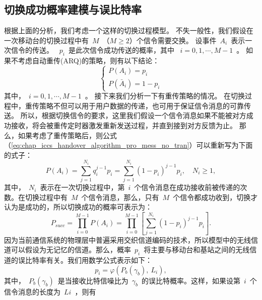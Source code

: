 \subsection{切换成功概率建模与误比特率}
根据上面的分析，我们考虑一个这样的切换过程模型。
不失一般性，我们假设在一次移动台的切换过程中有~$M$~（$M \ge 2 $）个信令需要交换。
设事件~$A_i$~表示一次信令的传送。
 ~$p_i$~是此次信令成功传送的概率，其中 ~$i = 0,1, \cdots, M-1 $~。
如果不考虑自动重传(ARQ)的策略，则有以下结论：
\begin{equation}
\label{eq:chap_iccs_handover_algorithm_pro_mess_no_tran}
\begin{cases}
P(A_{i})=p_{i}\\
P(\bar{A}_{i})=1- p_{i}
\end{cases}
\end{equation}
其中，~$i=0,1,\cdots,M-1$~。
接下来我们分析一下有重传策略的情况。
在切换过程中，重传策略不但可以用于用户数据的传递，也可用于保证信令消息的可靠传送。
所以，根据切换信令的要求，这里我们假设一个信令消息如果不能被对方成功接收，将会被重传定时器激发重新发送过程，并直到接到对方反馈为止。
那么，如果考虑了重传策略后，则公式 （\ref{eq:chap_iccs_handover_algorithm_pro_mess_no_tran}）可以重新写为下面的式子：
\begin{equation}
\label{eq:chap_iccs_handover_algorithm_Pro_basic01}
P(A_{i})=\sum_{j=1}^{N_{i}}q_{i}^{j-1}p_{i}=\sum_{j=1}^{N_{i}}
(1-p_{i})^{j-1}p_{i},\quad N_{i}\geq1,
\end{equation}
其中，~$N_i$~表示在一次切换过程中，第~$i$~个信令消息在成功接收前被传递的次数。在切换过程中有~$M$~个信令消息，那么，只有~$M$~个信令都成功收到，切换才认为是成功的，所以切换成功的概率可表示为：
\begin{equation}
\label{eq:chap_iccs_handover_algorithm_Pro_basic02}
P_{succ}=\prod_{i=0}^{M-1}P(A_{i})=\prod_{i=0}^{M-1}
\left[\sum_{j=1}^{N_{i}}(1-p_{i})^{j-1}p_{i}\right].
\end{equation}
因为当前通信系统的物理层中普遍采用交织信道编码的技术，所以模型中的无线信道可以假设为无记忆的信道。那么，概率~$p_i$~将主要与移动台和基站之间的无线信道的误比特率有关。我们用数学公式表示如下：
$$
p_{i}=\varphi(P_{b}(\gamma_{b}),\: L_{i}),
$$
其中，~$P_b(\gamma_b)$~是当接收比特信噪比为~$\gamma_b$~的误比特概率。这样，如果设第~$i$~个信令消息的长度为~$Li$~，则有
